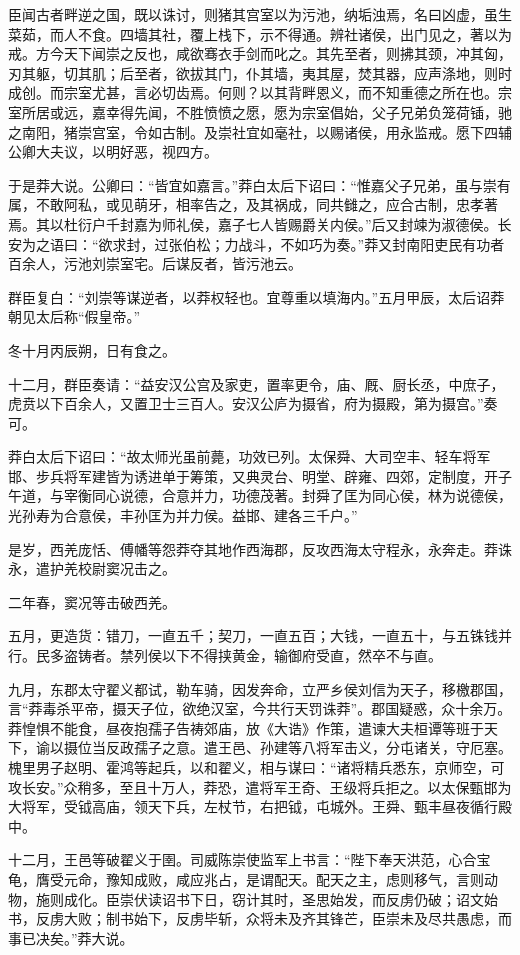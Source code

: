 \documentclass[]{article}
\begin{document}
臣闻古者畔逆之国，既以诛讨，则猪其宫室以为污池，纳垢浊焉，名曰凶虚，虽生菜茹，而人不食。四墙其社，覆上栈下，示不得通。辨社诸侯，出门见之，著以为戒。方今天下闻崇之反也，咸欲骞衣手剑而叱之。其先至者，则拂其颈，冲其匈，刃其躯，切其肌；后至者，欲拔其门，仆其墙，夷其屋，焚其器，应声涤地，则时成创。而宗室尤甚，言必切齿焉。何则？以其背畔恩义，而不知重德之所在也。宗室所居或远，嘉幸得先闻，不胜愤愤之愿，愿为宗室倡始，父子兄弟负笼荷锸，驰之南阳，猪崇宫室，令如古制。及崇社宜如毫社，以赐诸侯，用永监戒。愿下四辅公卿大夫议，以明好恶，视四方。

于是莽大说。公卿曰：``皆宜如嘉言。''莽白太后下诏曰：``惟嘉父子兄弟，虽与崇有属，不敢阿私，或见萌牙，相率告之，及其祸成，同共雠之，应合古制，忠孝著焉。其以杜衍户千封嘉为师礼侯，嘉子七人皆赐爵关内侯。''后又封竦为淑德侯。长安为之语曰：``欲求封，过张伯松；力战斗，不如巧为奏。''莽又封南阳吏民有功者百余人，污池刘崇室宅。后谋反者，皆污池云。

群臣复白：``刘崇等谋逆者，以莽权轻也。宜尊重以填海内。''五月甲辰，太后诏莽朝见太后称``假皇帝。''

冬十月丙辰朔，日有食之。

十二月，群臣奏请：``益安汉公宫及家吏，置率更令，庙、厩、厨长丞，中庶子，虎贲以下百余人，又置卫士三百人。安汉公庐为摄省，府为摄殿，第为摄宫。''奏可。

莽白太后下诏曰：``故太师光虽前薨，功效已列。太保舜、大司空丰、轻车将军邯、步兵将军建皆为诱进单于筹策，又典灵台、明堂、辟雍、四郊，定制度，开子午道，与宰衡同心说德，合意并力，功德茂著。封舜了匡为同心侯，林为说德侯，光孙寿为合意侯，丰孙匡为并力侯。益邯、建各三千户。''

是岁，西羌庞恬、傅幡等怨莽夺其地作西海郡，反攻西海太守程永，永奔走。莽诛永，遣护羌校尉窦况击之。

二年春，窦况等击破西羌。

五月，更造货：错刀，一直五千；契刀，一直五百；大钱，一直五十，与五铢钱并行。民多盗铸者。禁列侯以下不得挟黄金，输御府受直，然卒不与直。

九月，东郡太守翟义都试，勒车骑，因发奔命，立严乡侯刘信为天子，移檄郡国，言``莽毒杀平帝，摄天子位，欲绝汉室，今共行天罚诛莽''。郡国疑惑，众十余万。莽惶惧不能食，昼夜抱孺子告祷郊庙，放《大诰》作策，遣谏大夫桓谭等班于天下，谕以摄位当反政孺子之意。遣王邑、孙建等八将军击义，分屯诸关，守厄塞。槐里男子赵明、霍鸿等起兵，以和翟义，相与谋曰：``诸将精兵悉东，京师空，可攻长安。''众稍多，至且十万人，莽恐，遣将军王奇、王级将兵拒之。以太保甄邯为大将军，受钺高庙，领天下兵，左杖节，右把钺，屯城外。王舜、甄丰昼夜循行殿中。

十二月，王邑等破翟义于圉。司威陈崇使监军上书言：``陛下奉天洪范，心合宝龟，膺受元命，豫知成败，咸应兆占，是谓配天。配天之主，虑则移气，言则动物，施则成化。臣崇伏读诏书下日，窃计其时，圣思始发，而反虏仍破；诏文始书，反虏大败；制书始下，反虏毕斩，众将未及齐其锋芒，臣崇未及尽共愚虑，而事已决矣。''莽大说。
\end{document}

